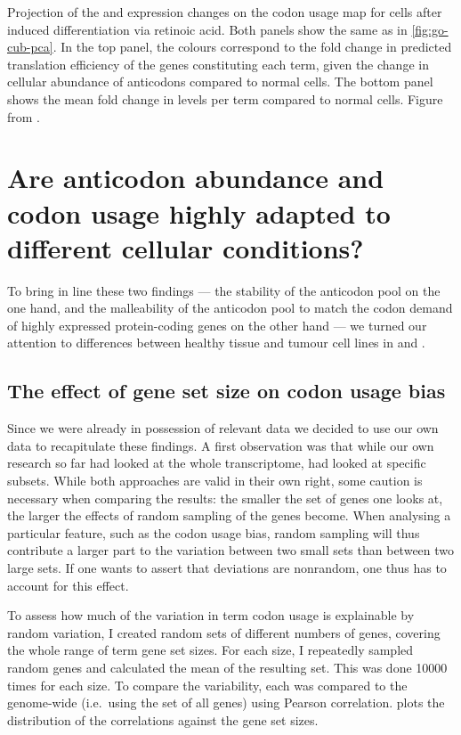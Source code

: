     {Projection of the \trna and \mrna expression changes on the codon usage
    map for cells after induced differentiation via retinoic acid.}
    {Both panels show the same \pca as in \cref{fig:go-cub-pca}. In the top
    panel, the colours correspond to the fold change in predicted translation
    efficiency of the genes constituting each \go term, given the change in
    cellular abundance of \trna anticodons compared to normal cells. The bottom
    panel shows the mean fold change in \mrna levels per \go term compared to
    normal cells. Figure from \citet{Gingold:2014}.}

\section{Are  anticodon abundance and codon usage highly adapted to
different cellular conditions?}

To bring in line these two findings — the stability of the anticodon pool on the
one hand, and the malleability of the anticodon pool to match the codon demand
of highly expressed protein-coding genes on the other hand — we turned our
attention to differences between healthy tissue and tumour cell lines in \mmu
and \hsa.

\subsection{The effect of gene set size on codon usage bias}

Since we were already in possession of relevant \trna data we decided to use our
own data to recapitulate these findings. A first observation was that while our
own research so far had looked at the whole transcriptome, \citet{Gingold:2014}
had looked at specific subsets. While both approaches are valid in their own
right, some caution is necessary when comparing the results: the smaller the set
of genes one looks at, the larger the effects of random sampling of the genes
become. When analysing a particular feature, such as the codon usage bias,
random sampling will thus contribute a larger part to the variation between two
small sets than between two large sets. If one wants to assert that deviations
are nonrandom, one thus has to account for this effect.

To assess how much of the variation in \go term codon usage is explainable by
random variation, I created random sets of different numbers of genes, covering
the whole range of \go term gene set sizes. For each size, I repeatedly sampled
random genes and calculated the mean \rcu of the resulting set. This was done
\num{10000} times for each size. To compare the \rcu variability, each \rcu was
compared to the genome-wide \rcu (i.e.\ using the set of all genes) using
Pearson correlation.  plots the distribution
of the correlations against the gene set sizes.

